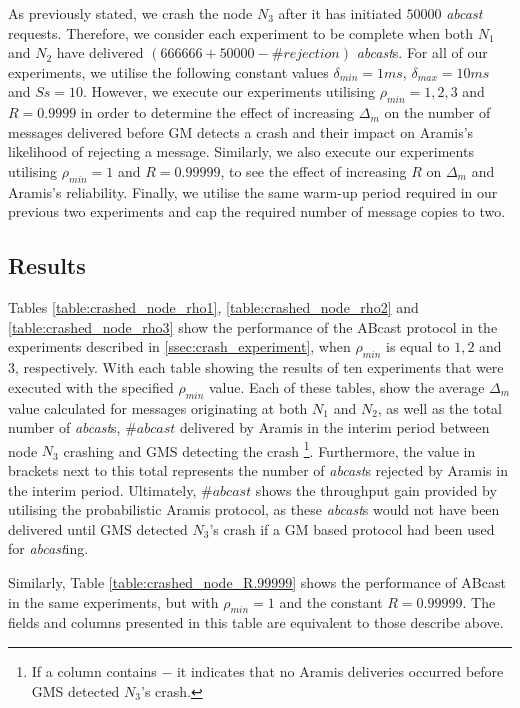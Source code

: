     As previously stated, we crash the node $N_3$ after it has initiated $50000$ \emph{abcast} requests.  Therefore, we consider each experiment to be complete when both $N_1$ and $N_2$ have delivered $(666666 + 50000 - \#rejection)$ \emph{abcast}s.  For all of our experiments, we utilise the following constant values $\delta_{min} = 1ms$, $\delta_{max} = 10ms$ and $Ss = 10$.  However, we execute our experiments utilising $\rho_{min} = 1,2,3$ and $R=0.9999$ in order to determine the effect of increasing $\Delta_m$ on the number of messages delivered before GM detects a crash and their impact on \textsf{Aramis}'s likelihood of rejecting a message.  Similarly, we also execute our experiments utilising $\rho_{min} = 1$ and $R=0.99999$, to see the effect of increasing $R$ on $\Delta_m$ and \textsf{Aramis}'s reliability.  Finally, we utilise the same warm-up period required in our previous two experiments and cap the required number of message copies to two.  %
    
    \subsection{Results}
    Tables \ref{table:crashed_node_rho1}, \ref{table:crashed_node_rho2} and \ref{table:crashed_node_rho3} show the performance of the \textsf{ABcast} protocol in the experiments described in \ref{ssec:crash_experiment}, when $\rho_{min}$ is equal to $1, 2$ and $3$, respectively.  With each table showing the results of ten experiments that were executed with the specified $\rho_{min}$ value.  Each of these tables, show the average $\Delta_m$ value calculated for messages originating at both $N_1$ and $N_2$, as well as the total number of \emph{abcast}s, $\#abcast$ delivered by \textsf{Aramis} in the interim period between node $N_3$ crashing and GMS detecting the crash \footnote{If a column contains $-$ it indicates that no \textsf{Aramis} deliveries occurred before GMS detected $N_3$'s crash.}.  Furthermore, the value in brackets next to this total represents the number of \emph{abcast}s rejected by \textsf{Aramis} in the interim period.  Ultimately, $\#abcast$ shows the throughput gain provided by utilising the probabilistic \textsf{Aramis} protocol, as these \emph{abcast}s would not have been delivered until GMS detected $N_3$'s crash if a GM based protocol had been used for \emph{abcast}ing.   

    Similarly, Table \ref{table:crashed_node_R.99999} shows the performance of \textsf{ABcast} in the same experiments, but with $\rho_{min} = 1$ and the constant $R = 0.99999$.  The fields and columns presented in this table are equivalent to those describe above.  
    
